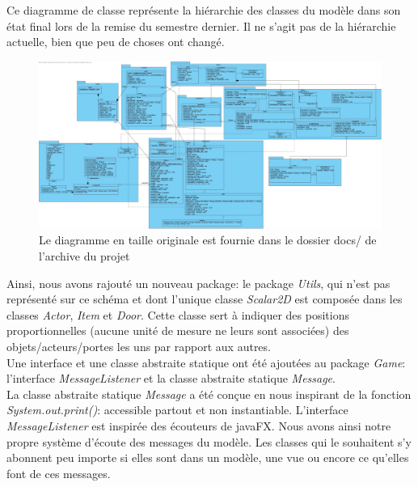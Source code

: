 \documentclass[./standalone.tex]{subfiles}
\begin{document}
Ce diagramme de classe représente la hiérarchie des classes du modèle dans son état final lors de la remise du semestre dernier. Il ne s'agit pas de la hiérarchie actuelle, bien que peu de choses ont changé.\\

\begin{flushleft}
	\begin{figure}[h!]
	\advance\leftskip-2.2cm
	\includegraphics[scale=0.19]{images/SIS.jpg}
	\caption{Le diagramme en taille originale est fournie dans le dossier docs/ de l'archive du projet}
	\end{figure}
\end{flushleft}

Ainsi, nous avons rajouté un nouveau package: le package \textit{Utils}, qui n'est pas représenté sur ce schéma et dont l'unique classe \textit{Scalar2D} est composée dans les classes \textit{Actor}, \textit{Item} et \textit{Door}. Cette classe sert à indiquer des positions proportionnelles (aucune unité de mesure ne leurs sont associées) des objets/acteurs/portes les uns par rapport aux autres.\\

Une interface et une classe abstraite statique ont été ajoutées au package \textit{Game}: l'interface \textit{MessageListener} et la classe abstraite statique \textit{Message}.\\

La classe abstraite statique \textit{Message} a été conçue en nous inspirant de la fonction \textit{System.out.print()}: accessible partout et non instantiable. L'interface \textit{MessageListener} est inspirée des écouteurs de javaFX. Nous avons ainsi notre propre système d'écoute des messages du modèle. Les classes qui le souhaitent s'y abonnent peu importe si elles sont dans un modèle, une vue ou encore ce qu'elles font de ces messages.

\newpage
\end{document}
